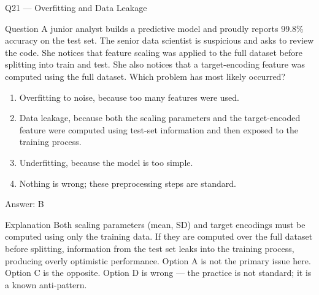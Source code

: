 \documentclass[aspectratio=169,8pt]{beamer}
\begin{document}
	\begin{frame}{Q21 --- Overfitting and Data Leakage}
		\begin{block}{Question}
			A junior analyst builds a predictive model and proudly reports 99.8\% accuracy on the test set. The senior data scientist is suspicious and asks to review the code. She notices that feature scaling was applied to the full dataset before splitting into train and test. She also notices that a target-encoding feature was computed using the full dataset. Which problem has most likely occurred?
		\end{block}
		\begin{enumerate}
			\item Overfitting to noise, because too many features were used.
			\item Data leakage, because both the scaling parameters and the target-encoded feature were computed using test-set information and then exposed to the training process.
			\item Underfitting, because the model is too simple.
			\item Nothing is wrong; these preprocessing steps are standard.
		\end{enumerate}
		\begin{exampleblock}{Answer: B}\end{exampleblock}
		\begin{block}{Explanation}
			Both scaling parameters (mean, SD) and target encodings must be computed using only the training data. If they are computed over the full dataset before splitting, information from the test set leaks into the training process, producing overly optimistic performance. Option A is not the primary issue here. Option C is the opposite. Option D is wrong --- the practice is not standard; it is a known anti-pattern.
		\end{block}
	\end{frame}
	
\end{document}
